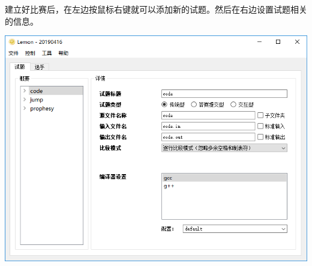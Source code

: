 \documentclass[12pt, a4paper]{article}
\begin{document}
建立好比赛后，在左边按鼠标右键就可以添加新的试题。然后在右边设置试题相关的信息。

\begin{center}
\includegraphics[scale=0.7]{pic/editproblem.png}
\end{center}
\end{document}
